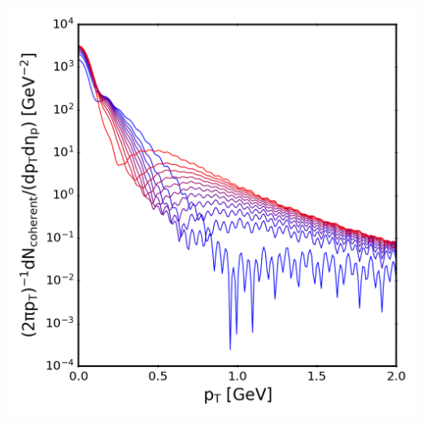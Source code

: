 {\begin{minipage}{\linewidth}
{\begin{minipage}{0.4\linewidth}
                \includegraphics[width=\linewidth]{code/C++/DCCspec/images/spectra_real_consteps_20240826_143253_m742_spec.png}        
            \end{minipage}
        }
        \label{fig:SpecRealConstEps_m742}
    \end{minipage}
}

